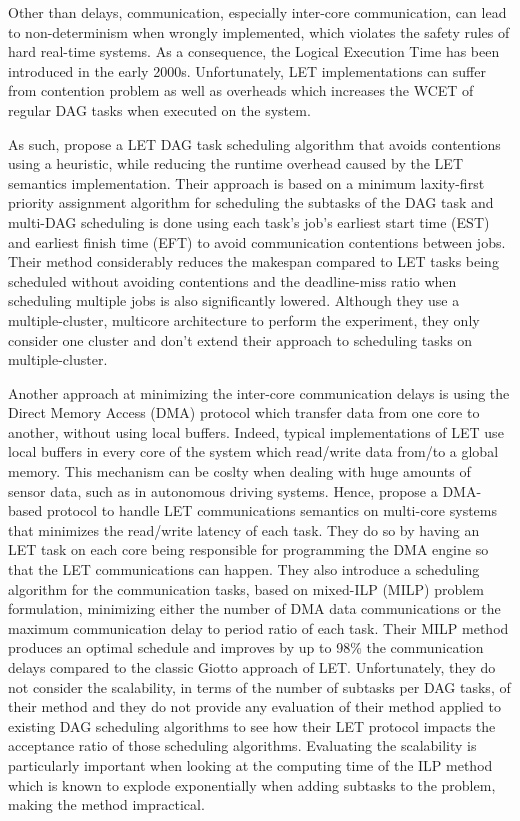 Other than delays, communication, especially inter-core communication,
can lead to non-determinism when wrongly implemented,
which violates the safety rules of hard real-time systems.
As a consequence, the Logical Execution Time has been 
introduced in the early 2000s\cite{henzinger2003giotto}.
Unfortunately, LET implementations can suffer from contention problem
as well as overheads
which increases the WCET of regular DAG tasks when executed on the system.

As such, \citet{Igarashi2020HeuristicContentionFree}
propose a LET DAG task scheduling algorithm that
avoids contentions using a heuristic, while reducing the runtime
overhead caused by the LET semantics implementation.
Their approach is based on a minimum laxity-first priority
assignment algorithm for scheduling the subtasks of the DAG task
and multi-DAG scheduling is done using each task's job's earliest start time (EST)
and earliest finish time (EFT) to avoid communication contentions between jobs.
Their method considerably reduces the makespan 
compared to LET tasks being scheduled without 
avoiding contentions and the deadline-miss ratio when 
scheduling multiple jobs is also 
significantly lowered.
Although they use a multiple-cluster, multicore architecture to 
perform the experiment, they only consider one cluster
and don't extend their approach to scheduling tasks 
on multiple-cluster.

Another approach at minimizing the inter-core communication delays
is using the Direct Memory Access (DMA) protocol
which transfer data from one core to another, without using local buffers.
Indeed, typical implementations of LET use 
local buffers in every core of the system
which read/write data from/to a global memory.
This mechanism can be coslty when dealing 
with huge amounts of sensor data, such as in
autonomous driving systems.
Hence, \citet{Pazzaglia2021DMALETtransfer}
propose a DMA-based protocol to handle LET communications semantics
on multi-core systems that minimizes the read/write latency of each task.
They do so by having an LET task on each core being responsible for 
programming the DMA engine so that the LET communications
can happen.
They also introduce a scheduling algorithm 
for the communication tasks, based on mixed-ILP (MILP)
problem formulation, minimizing either the
number of DMA data communications or 
the maximum communication delay to period ratio
of each task.
Their MILP method produces an optimal schedule
and improves by up to 98\% the communication delays
compared to the classic Giotto approach of LET\cite{henzinger2003giotto}.
Unfortunately, 
they do not consider the scalability, in terms of the number of subtasks
per DAG tasks, of their method and they do not provide any 
evaluation of their method applied to existing DAG scheduling algorithms
to see how their LET protocol impacts the acceptance ratio of those scheduling algorithms.
Evaluating the scalability is particularly important when looking at the computing time 
of the ILP method\cite{Zhao2024GATDRLmodel} which is known to explode
exponentially when adding subtasks to the problem, making the method impractical.


